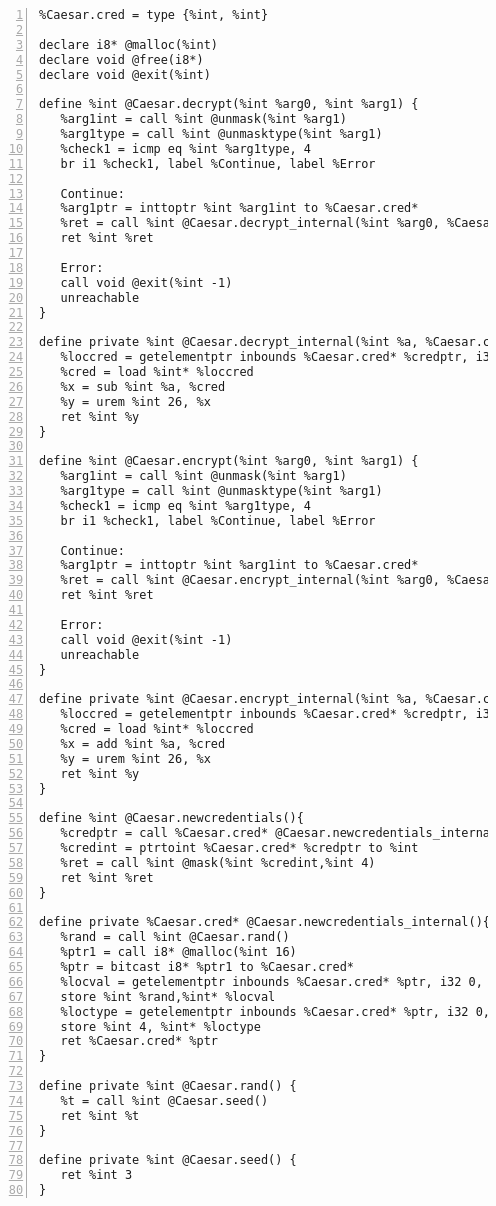 \begin{lstlisting}[frame=single,numbers=left, language={[x86masm]Assembler}, caption=LLVM IR for the example,
label=llvm:Example]
%int = type i64
%Caesar.cred = type {%int, %int}

declare i8* @malloc(%int)
declare void @free(i8*)
declare void @exit(%int)

define %int @Caesar.decrypt(%int %arg0, %int %arg1) {
   %arg1int = call %int @unmask(%int %arg1)
   %arg1type = call %int @unmasktype(%int %arg1)
   %check1 = icmp eq %int %arg1type, 4
   br i1 %check1, label %Continue, label %Error
   
   Continue:
   %arg1ptr = inttoptr %int %arg1int to %Caesar.cred*
   %ret = call %int @Caesar.decrypt_internal(%int %arg0, %Caesar.cred* %arg1ptr)
   ret %int %ret
   
   Error:
   call void @exit(%int -1)
   unreachable
}

define private %int @Caesar.decrypt_internal(%int %a, %Caesar.cred* %credptr) {
   %loccred = getelementptr inbounds %Caesar.cred* %credptr, i32 0, i32 0
   %cred = load %int* %loccred 
   %x = sub %int %a, %cred
   %y = urem %int 26, %x 
   ret %int %y
}

define %int @Caesar.encrypt(%int %arg0, %int %arg1) {
   %arg1int = call %int @unmask(%int %arg1)
   %arg1type = call %int @unmasktype(%int %arg1)
   %check1 = icmp eq %int %arg1type, 4
   br i1 %check1, label %Continue, label %Error
   
   Continue:
   %arg1ptr = inttoptr %int %arg1int to %Caesar.cred*
   %ret = call %int @Caesar.encrypt_internal(%int %arg0, %Caesar.cred* %arg1ptr)
   ret %int %ret
   
   Error:
   call void @exit(%int -1)
   unreachable
}

define private %int @Caesar.encrypt_internal(%int %a, %Caesar.cred* %credptr) {
   %loccred = getelementptr inbounds %Caesar.cred* %credptr, i32 0, i32 0
   %cred = load %int* %loccred
   %x = add %int %a, %cred
   %y = urem %int 26, %x
   ret %int %y
}

define %int @Caesar.newcredentials(){
   %credptr = call %Caesar.cred* @Caesar.newcredentials_internal()
   %credint = ptrtoint %Caesar.cred* %credptr to %int
   %ret = call %int @mask(%int %credint,%int 4)
   ret %int %ret
}

define private %Caesar.cred* @Caesar.newcredentials_internal(){
   %rand = call %int @Caesar.rand()
   %ptr1 = call i8* @malloc(%int 16)
   %ptr = bitcast i8* %ptr1 to %Caesar.cred*
   %locval = getelementptr inbounds %Caesar.cred* %ptr, i32 0, i32 0
   store %int %rand,%int* %locval
   %loctype = getelementptr inbounds %Caesar.cred* %ptr, i32 0, i32 0
   store %int 4, %int* %loctype
   ret %Caesar.cred* %ptr
}

define private %int @Caesar.rand() {
   %t = call %int @Caesar.seed()
   ret %int %t
}

define private %int @Caesar.seed() {
   ret %int 3
}
\end{lstlisting}

